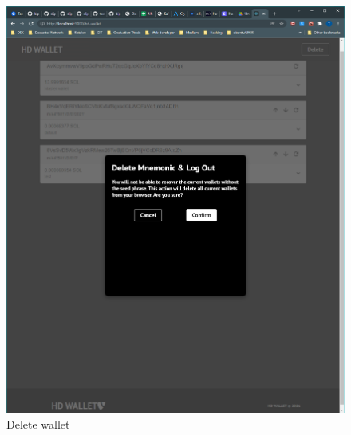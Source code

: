   \begin{figure}[h!]
    \centering
    \includegraphics[width=1\textwidth]{images/DeleteMnemonic.png}
    \caption[Delete wallet]{Delete wallet}
    \label{fig:delwallet}
  \end{figure}
